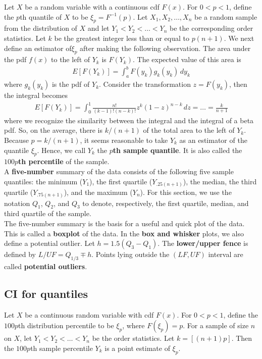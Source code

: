 \documentclass{book}
\theoremstyle{definition}
\newcommand{\f}[2]{\frac{#1}{#2}}
\begin{document}
Let $X$ be a random variable with a continuous cdf $F(x)$. For $0 <p< 1$, define
the $p$th quantile of $X$ to be $\xi_p = F^{-1}(p)$. Let $X_1, X_2,\dots,X_n$ be a random sample from the distribution of $X$ and let $Y_1 < Y_2 < \dots < Y_n$ be the corresponding order statistics. Let $k$ be the greatest integer less than or equal to $p(n + 1)$. We next define an estimator of$\xi_p$
after making the following observation. The area under the pdf $f(x)$ to the left of
$Y_k$ is $F(Y_k)$. The expected value of this area is 
\begin{align}
E[F(Y_k)] = \int^b_a F(y_k)g_k(y_k)\,dy_k
\end{align}
where $g_k(y_k)$ is the pdf of $Y_k$. Consider the transformation $z = F(y_k)$, then the integral becomes
\begin{align}
E[F(Y_k)] = \int^1_0 \f{n!}{(k-1)!(n-k)!}z^k (1-z)^{n-k}\,dz = \dots = \f{k}{n+1}
\end{align} 
where we recognize the similarity between the integral and the integral of a beta pdf. So, on the average, there is $k/(n + 1)$ of the total area to the left of $Y_k$. Because
$p = k/(n + 1)$, it seems reasonable to take $Y_k$ as an estimator of the quantile $\xi_p$. Hence, we call $Y_k$ the \textbf{$p$th sample quantile}. It is also called the \textbf{$100p$th percentile} of the sample.\\

A \textbf{five-number} summary of the data consists of the following five sample quantiles: the minimum ($Y_1$), the first quartile ($Y_{.25(n+1)}$), the median, the third quartile ($Y_{.75(n+1)}$), and the maximum ($Y_n$). For this section, we use the notation $Q_1$, $Q_2$, and $Q_3$ to denote, respectively, the first quartile, median, and third quartile of the sample.\\

The five-number summary is the basis for a useful and quick plot of the data.
This is called a \textbf{boxplot} of the data. In the \textbf{box and whisker} plots, we also define a potential outlier. Let $h = 1.5(Q_3 - Q_1)$. The \textbf{lower/upper fence} is defined by $L/UF = Q_{1/3} \mp h$. Points lying outside the $(LF,UF)$ interval are called \textbf{potential outliers}. 



\subsection{CI for quantiles}

Let $X$ be a continuous random variable with cdf $F(x)$. For $0 <p< 1$, define the
$100p$th distribution percentile to be $\xi_p$, where $F(\xi_p) = p$. For a sample of size $n$ on
$X$, let $Y_1 < Y_2 < \dots < Y_n$ be the order statistics. Let $k = [(n + 1)p]$. Then the
$100p$th sample percentile $Y_k$ is a point estimate of $\xi_p$.\\
\end{document}
